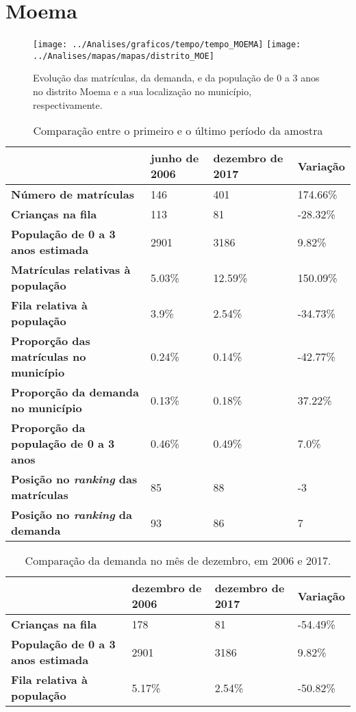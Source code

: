 \section{Moema}
\begin{figure}[H]
	\centering
	\texttt{[image: ../Analises/graficos/tempo/tempo\_MOEMA]}
	\texttt{[image: ../Analises/mapas/mapas/distrito\_MOE]}
	\caption{Evolução das matrículas, da demanda, e da população de 0 a 3 anos no distrito Moema e a sua localização no município, respectivamente.}
\end{figure}
\begin{table}[H]
	\begin{tabular}{|l|l|l|l|}
		\hline
		\textbf{}                                      & \textbf{junho de 2006}       & \textbf{dezembro de 2017}    & \textbf{Variação} \\ \hline
		\textbf{Número de matrículas}                  & 146 & 401 & 174.66\% \\ \hline
		\textbf{Crianças na fila}                      & 113 & 81 & -28.32\% \\ \hline
		\textbf{População de 0 a 3 anos estimada}      & 2901 & 3186 & 9.82\% \\ \hline
		\textbf{Matrículas relativas à população}      & 5.03\% & 12.59\% & 150.09\% \\ \hline
		\textbf{Fila relativa à população}             & 3.9\% & 2.54\% & -34.73\% \\ \hline
		\textbf{Proporção das matrículas no município} & 0.24\% & 0.14\% & -42.77\% \\ \hline
		\textbf{Proporção da demanda no município}     & 0.13\% & 0.18\% & 37.22\% \\ \hline
		\textbf{Proporção da população de 0 a 3 anos}  & 0.46\% & 0.49\% & 7.0\% \\ \hline
		\textbf{Posição no \textit{ranking} das matrículas}     & 85 & 88 & -3 \\ \hline
		\textbf{Posição no \textit{ranking} da demanda}         & 93 & 86 & 7 \\ \hline
	\end{tabular}
	\caption{Comparação entre o primeiro e o último período da amostra}
\end{table}
\begin{table}[H]
	\begin{tabular}{|l|l|l|l|}
		\hline
		\textbf{}                                 & \textbf{dezembro de 2006} & \textbf{dezembro de 2017} & \textbf{Variação} \\ \hline
		\textbf{Crianças na fila}                      & 178 & 81 & -54.49\% \\ \hline
		\textbf{População de 0 a 3 anos estimada}      & 2901 & 3186 & 9.82\% \\ \hline
		\textbf{Fila relativa à população}             & 5.17\% & 2.54\% & -50.82\% \\ \hline
	\end{tabular}
	\caption{Comparação da demanda no mês de dezembro, em 2006 e 2017.}
\end{table}

